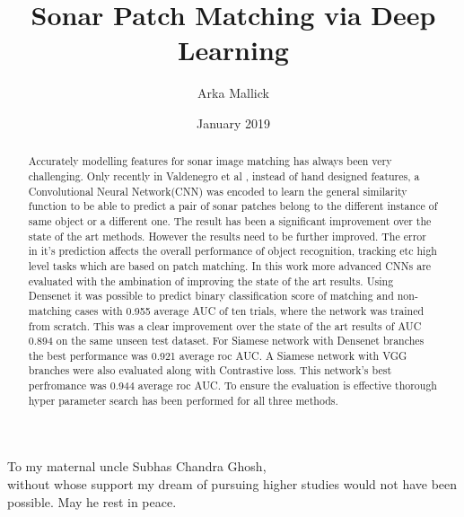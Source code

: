 \documentclass[thesis]{mas_report}
\author{Arka Mallick}
\title{Sonar Patch Matching via Deep Learning}
\date{January 2019}
\begin{document}
\begin{titlepage}
    \maketitle
\end{titlepage}


\pagestyle{plain}


\cleardoublepage
\statementpage

\begin{abstract}
Accurately modelling features for sonar image matching has always been very challenging. Only recently in Valdenegro et al \cite{stateoftheart}, instead of hand designed 
features, a Convolutional Neural Network(CNN) was encoded to learn the general similarity function to be able to predict a pair of sonar patches belong to the different instance of same object or a different one. 
The result has been a significant improvement over the state of the art methods.
However the results need to be further improved. The error in it's prediction affects the overall performance of object recognition, tracking etc high level tasks which are based on patch matching. In this work more advanced 
CNNs are evaluated with the ambination of improving the state of the art results. Using Densenet it was possible to predict binary classification score of matching and non-matching cases with 0.955 average AUC of ten trials, 
where the network was trained from scratch. This was a clear improvement over the state of the art \cite{stateoftheart} results of AUC 0.894 on the same unseen test dataset. 
For Siamese network with Densenet branches the best performance was 0.921 average roc AUC.
A Siamese network with VGG branches were also evaluated along with Contrastive loss. This network's 
best perfromance was 0.944 average roc AUC. To ensure the evaluation is effective thorough hyper parameter search has been performed for all three methods. 
\end{abstract}

\cleardoublepage


\begin{dedication}
 To my maternal uncle Subhas Chandra Ghosh, \\
 without whose support my dream of pursuing higher studies would not have been possible.
 May he rest in peace.
\end{dedication}
\end{document}
